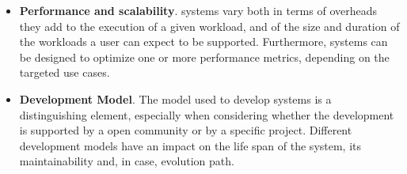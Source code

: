 \documentclass{sig-alternate}
\begin{document}
\begin{itemize}
\item \textbf{Performance and scalability}. \pilot systems vary both in
  terms of overheads they add to the execution of a given workload, and of the
  size and duration of the workloads a user can expect to be supported.
  Furthermore, \pilot systems can be designed to optimize one or more
  performance metrics, depending on the targeted use cases.

\item \textbf{Development Model}. The model used to develop \pilot systems is a
  distinguishing element, especially when considering whether the development
  is supported by a open community or by a specific project. Different
  development models have an impact on the life span of the \pilot system, its
  maintainability and, in case, evolution path.

\end{itemize}
\end{document}
